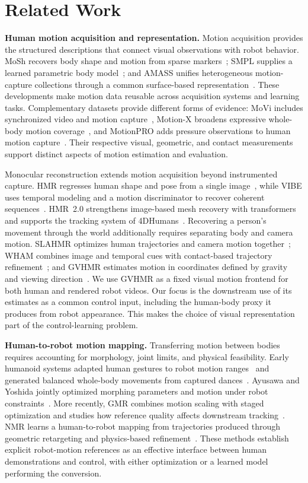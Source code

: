 \section{Related Work}
\textbf{Human motion acquisition and representation.}
Motion acquisition provides the structured descriptions that connect visual observations with robot behavior. MoSh recovers body shape and motion from sparse markers~\cite{mosh}; SMPL supplies a learned parametric body model~\cite{smpl}; and AMASS unifies heterogeneous motion-capture collections through a common surface-based representation~\cite{amass}. These developments make motion data reusable across acquisition systems and learning tasks. Complementary datasets provide different forms of evidence: MoVi includes synchronized video and motion capture~\cite{movi}, Motion-X broadens expressive whole-body motion coverage~\cite{motionx}, and MotionPRO adds pressure observations to human motion capture~\cite{motionpro}. Their respective visual, geometric, and contact measurements support distinct aspects of motion estimation and evaluation.

Monocular reconstruction extends motion acquisition beyond instrumented capture. HMR regresses human shape and pose from a single image~\cite{hmr}, while VIBE uses temporal modeling and a motion discriminator to recover coherent sequences~\cite{vibe}. HMR~2.0 strengthens image-based mesh recovery with transformers and supports the tracking system of 4DHumans~\cite{hmr2}. Recovering a person's movement through the world additionally requires separating body and camera motion. SLAHMR optimizes human trajectories and camera motion together~\cite{slahmr}; WHAM combines image and temporal cues with contact-based trajectory refinement~\cite{wham}; and GVHMR estimates motion in coordinates defined by gravity and viewing direction~\cite{gvhmr}. We use GVHMR as a fixed visual motion frontend for both human and rendered robot videos. Our focus is the downstream use of its estimates as a common control input, including the human-body proxy it produces from robot appearance. This makes the choice of visual representation part of the control-learning problem.

\textbf{Human-to-robot motion mapping.}
Transferring motion between bodies requires accounting for morphology, joint limits, and physical feasibility. Early humanoid systems adapted human gestures to robot motion ranges~\cite{pollard2002} and generated balanced whole-body movements from captured dances~\cite{nakaoka2003}. Ayusawa and Yoshida jointly optimized morphing parameters and motion under robot constraints~\cite{ayusawa2017}. More recently, GMR combines motion scaling with staged optimization and studies how reference quality affects downstream tracking~\cite{gmr}. NMR learns a human-to-robot mapping from trajectories produced through geometric retargeting and physics-based refinement~\cite{nmr}. These methods establish explicit robot-motion references as an effective interface between human demonstrations and control, with either optimization or a learned model performing the conversion.

